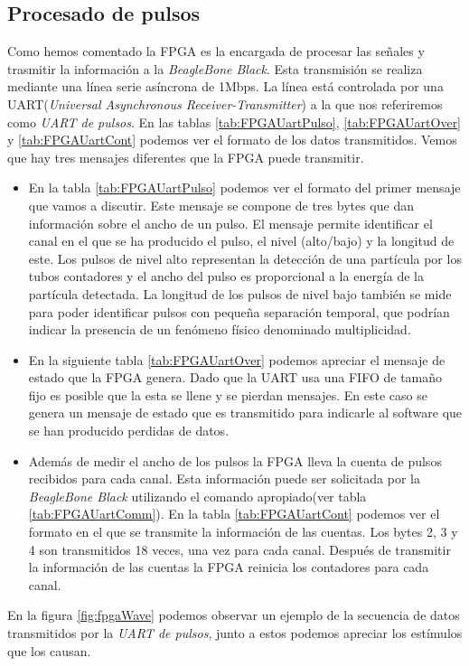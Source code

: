 	\subsection{Procesado de pulsos}
		Como hemos comentado la FPGA es la encargada de procesar las señales y trasmitir la información a la \emph{BeagleBone Black}. Esta
		transmisión se realiza mediante una línea serie asíncrona de 1Mbps. La línea está controlada por una UART(\emph{Universal Asynchronous
		Receiver-Transmitter}) a la que nos referiremos como \emph{UART de pulsos}. En las tablas \ref{tab:FPGAUartPulso},
		\ref{tab:FPGAUartOver} y \ref{tab:FPGAUartCont} podemos ver el formato de los datos transmitidos. Vemos que hay tres mensajes
		diferentes que la FPGA puede transmitir.
		\begin{itemize}
			\item	En la tabla \ref{tab:FPGAUartPulso} podemos ver el formato del primer mensaje que vamos a discutir. Este mensaje se
				compone de tres bytes que dan información sobre el ancho de un pulso. El mensaje permite identificar el canal en el
				que se ha producido el pulso, el nivel (alto/bajo) y la longitud de este. Los pulsos de nivel alto representan la
				detección de una partícula por los tubos contadores y el ancho del pulso es proporcional a la energía de la partícula
				detectada. La longitud de los pulsos de nivel bajo también se mide para poder identificar pulsos con pequeña
				separación temporal, que podrían indicar la presencia de un fenómeno físico denominado multiplicidad.
			\item 	En la siguiente tabla \ref{tab:FPGAUartOver} podemos apreciar el mensaje de estado que la FPGA genera. Dado que la UART usa
				una FIFO de tamaño fijo es posible que la esta se llene y se pierdan mensajes. En este caso se genera un mensaje de
				estado que es transmitido para indicarle al software que se han producido perdidas de datos.
			\item	Además de medir el ancho de los pulsos la FPGA lleva la cuenta de pulsos recibidos para cada canal. Esta información
			 	puede ser solicitada por la \emph{BeagleBone Black} utilizando el comando apropiado(ver tabla \ref{tab:FPGAUartComm}). En la
				tabla \ref{tab:FPGAUartCont} podemos ver el formato en el que se transmite la información de las cuentas. Los bytes 2,
				3 y 4 son transmitidos 18 veces, una vez para cada canal. Después de transmitir la información de las cuentas la FPGA
				reinicia los contadores para cada canal.
		\end{itemize}
		En la figura \ref{fig:fpgaWave} podemos observar un ejemplo de la secuencia de datos transmitidos por la \emph{UART de pulsos}, junto a
		estos podemos apreciar los estímulos que los causan. 


